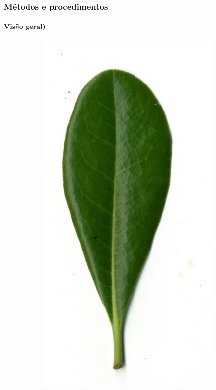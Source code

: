 \begin{frame}
\frametitle{Métodos e procedimentos}
\framesubtitle{Visão geral)}

\begin{figure}[ht!]
	\centering
	\caption{Exemplo (simples) das etapas de desenvolvimento}
	\begin{subfigure}[b]{0.19\textwidth}
		\centering
		\includegraphics[width=\textwidth]{img/original.jpg}

\end{subfigure}
\end{figure}
\end{frame}

